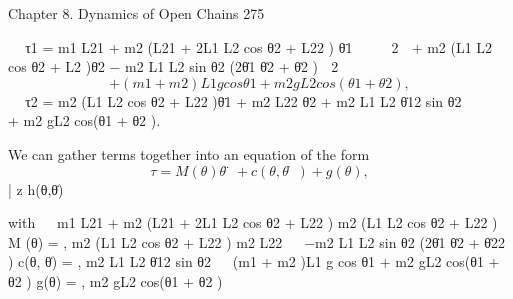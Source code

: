 \documentclass[12pt,a4paper]{article}
\begin{document}
Chapter 8. Dynamics of Open Chains                                                                    275

                                                                              
       τ1   =       m1 L21 + m2 (L21 + 2L1 L2 cos θ2 + L22 ) θ̈1               
                                                                               
                                                                               
                                                                               
                                                                             2 
              + m2 (L1 L2 cos θ2 + L2 )θ̈2 − m2 L1 L2 sin θ2 (2θ̇1 θ̇2 + θ̇2 ) 
                                       2
                                                                               
                                                                               
\begin{equation}
+ (m1 + m2 )L1 g cos θ1 + m2 gL2 cos(θ1 + θ2 ),
\label{eq:8.9}
\end{equation}
                                                                               
                                                                               
       τ2   = m2 (L1 L2 cos θ2 + L22 )θ̈1 + m2 L22 θ̈2 + m2 L1 L2 θ̇12 sin θ2 
                                                                               
                                                                               
                                                                               
                                                                               
              + m2 gL2 cos(θ1 + θ2 ).

    We can gather terms together into an equation of the form
\begin{equation}
τ = M (θ)θ̈ + c(θ, θ̇) + g(θ),
\label{eq:8.10}
\end{equation}
                                                |      {z     }
                                                         h(θ,θ̇)

with
                                                                                                 
                m1 L21 + m2 (L21 + 2L1 L2 cos θ2 + L22 ) m2 (L1 L2 cos θ2 + L22 )
    M (θ) =                                                                                           ,
                        m2 (L1 L2 cos θ2 + L22 )                  m2 L22
                                                   
                −m2 L1 L2 sin θ2 (2θ̇1 θ̇2 + θ̇22 )
   c(θ, θ̇) =                                         ,
                       m2 L1 L2 θ̇12 sin θ2
                                                             
                (m1 + m2 )L1 g cos θ1 + m2 gL2 cos(θ1 + θ2 )
     g(θ) =                                                     ,
                             m2 gL2 cos(θ1 + θ2 )
\end{document}
